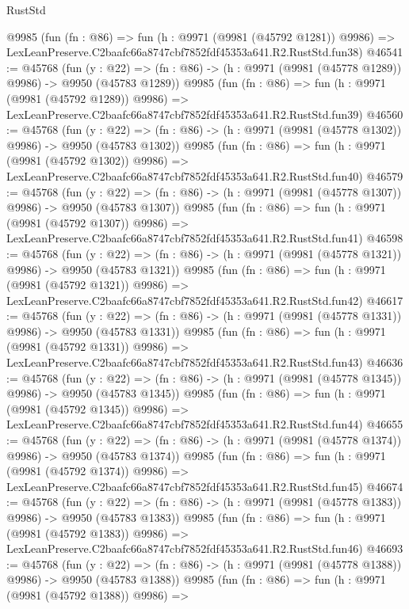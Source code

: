 \begin{lexlean}{RustStd}
\begin{coremodule}
    @9985
    (fun (fn : @86) =>
    fun (h : @9971 (@9981 (@45792 @1281)) @9986) =>
    LexLeanPreserve.C2baafc66a8747cbf7852fdf45353a641.R2.RustStd.fun38)
@46541 := @45768
    (fun (y : @22) =>
    (fn : @86) -> (h : @9971 (@9981 (@45778 @1289)) @9986) -> @9950 (@45783 @1289))
    @9985
    (fun (fn : @86) =>
    fun (h : @9971 (@9981 (@45792 @1289)) @9986) =>
    LexLeanPreserve.C2baafc66a8747cbf7852fdf45353a641.R2.RustStd.fun39)
@46560 := @45768
    (fun (y : @22) =>
    (fn : @86) -> (h : @9971 (@9981 (@45778 @1302)) @9986) -> @9950 (@45783 @1302))
    @9985
    (fun (fn : @86) =>
    fun (h : @9971 (@9981 (@45792 @1302)) @9986) =>
    LexLeanPreserve.C2baafc66a8747cbf7852fdf45353a641.R2.RustStd.fun40)
@46579 := @45768
    (fun (y : @22) =>
    (fn : @86) -> (h : @9971 (@9981 (@45778 @1307)) @9986) -> @9950 (@45783 @1307))
    @9985
    (fun (fn : @86) =>
    fun (h : @9971 (@9981 (@45792 @1307)) @9986) =>
    LexLeanPreserve.C2baafc66a8747cbf7852fdf45353a641.R2.RustStd.fun41)
@46598 := @45768
    (fun (y : @22) =>
    (fn : @86) -> (h : @9971 (@9981 (@45778 @1321)) @9986) -> @9950 (@45783 @1321))
    @9985
    (fun (fn : @86) =>
    fun (h : @9971 (@9981 (@45792 @1321)) @9986) =>
    LexLeanPreserve.C2baafc66a8747cbf7852fdf45353a641.R2.RustStd.fun42)
@46617 := @45768
    (fun (y : @22) =>
    (fn : @86) -> (h : @9971 (@9981 (@45778 @1331)) @9986) -> @9950 (@45783 @1331))
    @9985
    (fun (fn : @86) =>
    fun (h : @9971 (@9981 (@45792 @1331)) @9986) =>
    LexLeanPreserve.C2baafc66a8747cbf7852fdf45353a641.R2.RustStd.fun43)
@46636 := @45768
    (fun (y : @22) =>
    (fn : @86) -> (h : @9971 (@9981 (@45778 @1345)) @9986) -> @9950 (@45783 @1345))
    @9985
    (fun (fn : @86) =>
    fun (h : @9971 (@9981 (@45792 @1345)) @9986) =>
    LexLeanPreserve.C2baafc66a8747cbf7852fdf45353a641.R2.RustStd.fun44)
@46655 := @45768
    (fun (y : @22) =>
    (fn : @86) -> (h : @9971 (@9981 (@45778 @1374)) @9986) -> @9950 (@45783 @1374))
    @9985
    (fun (fn : @86) =>
    fun (h : @9971 (@9981 (@45792 @1374)) @9986) =>
    LexLeanPreserve.C2baafc66a8747cbf7852fdf45353a641.R2.RustStd.fun45)
@46674 := @45768
    (fun (y : @22) =>
    (fn : @86) -> (h : @9971 (@9981 (@45778 @1383)) @9986) -> @9950 (@45783 @1383))
    @9985
    (fun (fn : @86) =>
    fun (h : @9971 (@9981 (@45792 @1383)) @9986) =>
    LexLeanPreserve.C2baafc66a8747cbf7852fdf45353a641.R2.RustStd.fun46)
@46693 := @45768
    (fun (y : @22) =>
    (fn : @86) -> (h : @9971 (@9981 (@45778 @1388)) @9986) -> @9950 (@45783 @1388))
    @9985
    (fun (fn : @86) =>
    fun (h : @9971 (@9981 (@45792 @1388)) @9986) =>

\end{coremodule}
\end{lexlean}
